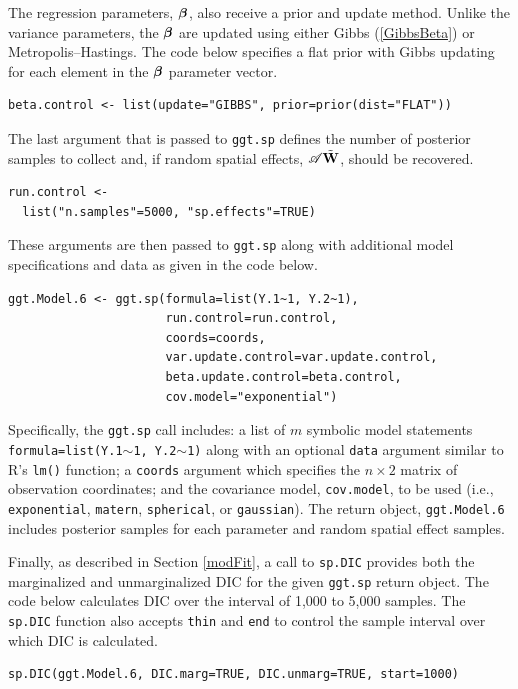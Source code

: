 \documentclass[a4paper]{article}
\newcommand{\bbeta}{ \mbox{\boldmath $ \beta $} }
\newcommand{\bW}{\textbf{W}}
\let\code=\texttt
\let\proglang=\textsf
\begin{document}
The regression parameters, $\bbeta$, also receive a prior and update
method.  Unlike the variance parameters, the $\bbeta$ are updated
using either Gibbs (\ref{GibbsBeta}) or Metropolis--Hastings.  The
code below specifies a flat prior with Gibbs updating for each
element in the $\bbeta$ parameter vector.
\begin{verbatim}
beta.control <- list(update="GIBBS", prior=prior(dist="FLAT"))
\end{verbatim}

The last argument that is passed to \code{ggt.sp} defines the number
of posterior samples to collect and, if random spatial
effects, ${\cal A}\tilde{\bW}$, should be recovered.
\begin{verbatim}
run.control <-
  list("n.samples"=5000, "sp.effects"=TRUE)
\end{verbatim}

These arguments are then passed to \code{ggt.sp} along with additional model specifications and data as given in the code below.
\begin{verbatim}
ggt.Model.6 <- ggt.sp(formula=list(Y.1~1, Y.2~1),
                      run.control=run.control,
                      coords=coords,
                      var.update.control=var.update.control,
                      beta.update.control=beta.control,
                      cov.model="exponential")
\end{verbatim}
Specifically, the \code{ggt.sp} call includes: a list of $m$
symbolic model statements\\ \code{formula=list(Y.1$\sim$1,
Y.2$\sim$1)} along with an optional \code{data} argument similar to
\proglang{R}'s \code{lm()} function; a \code{coords} argument which
specifies the $n\times 2$ matrix of observation coordinates; and the
covariance model, \code{cov.model}, to be used (i.e.,
\code{exponential}, \code{matern}, \code{spherical}, or
\code{gaussian}).  The return object, \code{ggt.Model.6} includes
posterior samples for each parameter and random spatial effect samples.

Finally, as described in Section \ref{modFit}, a call to \code{sp.DIC} provides both the marginalized and unmarginalized DIC for the given \code{ggt.sp} return object.  The code below calculates DIC over the interval of 1,000 to 5,000 samples.  The \code{sp.DIC} function also accepts \code{thin} and \code{end} to control the sample interval over which DIC is calculated.
\begin{verbatim}
sp.DIC(ggt.Model.6, DIC.marg=TRUE, DIC.unmarg=TRUE, start=1000)
\end{verbatim}
\end{document}
